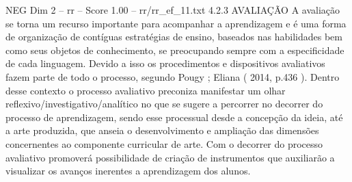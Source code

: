 \begin{textsample}{NEG Dim 2 – rr – Score 1.00 – rr/rr\_ef\_11.txt}  \label{ex:f2_neg_187}
4.2.3 AVALIAÇÃO A avaliação se torna um recurso importante para acompanhar a aprendizagem e é uma forma de organização de contíguas estratégias de ensino, baseados nas habilidades bem como seus objetos de conhecimento, se preocupando sempre com a especificidade de cada linguagem.
Devido a isso os procedimentos e dispositivos avaliativos fazem parte de todo o processo, segundo Pougy ; Eliana ( 2014, p.436 ).
Dentro desse contexto o processo avaliativo preconiza manifestar um olhar reflexivo/investigativo/analítico no que se sugere a percorrer no decorrer do processo de aprendizagem, sendo esse processual desde a concepção da ideia, até a arte produzida, que anseia o desenvolvimento e ampliação das dimensões concernentes ao componente curricular de arte.
Com o decorrer do processo avaliativo promoverá possibilidade de criação de instrumentos que auxiliarão a visualizar os avanços inerentes a aprendizagem dos alunos.

\end{textsample}
